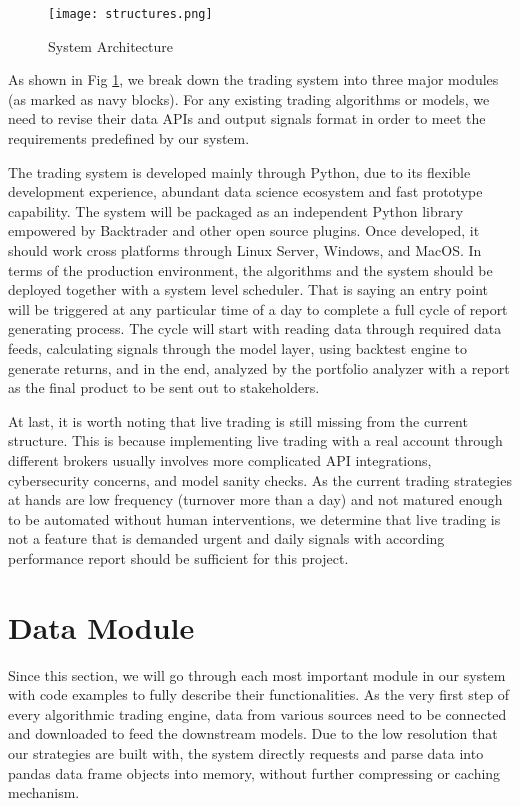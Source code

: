 \documentclass[12pt]{article}
\begin{document}
\begin{figure}[H]
    \centering
    \texttt{[image: structures.png]}
    \caption{System Architecture}
    \label{fig:system_architecture}
\end{figure}

As shown in Fig \ref{fig:system_architecture}, we break down the trading system into three major modules (as marked as navy blocks). For any existing trading algorithms or models, we need to revise their data APIs and output signals format in order to meet the requirements predefined by our system.

The trading system is developed mainly through Python, due to its flexible development experience, abundant data science ecosystem and fast prototype capability. The system will be packaged as an independent Python library empowered by Backtrader and other open source plugins. Once developed, it should work cross platforms through Linux Server, Windows, and MacOS. In terms of the production environment, the algorithms and the system should be deployed together with a system level scheduler. That is saying an entry point will be triggered at any particular time of a day to complete a full cycle of report generating process. The cycle will start with reading data through required data feeds, calculating signals through the model layer, using backtest engine to generate returns, and in the end, analyzed by the portfolio analyzer with a report as the final product to be sent out to stakeholders. 

At last, it is worth noting that live trading is still missing from the current structure. This is because implementing live trading with a real account through different brokers usually involves more complicated API integrations, cybersecurity concerns, and model sanity checks. As the current trading strategies at hands are low frequency (turnover more than a day) and not matured enough to be automated without human interventions, we determine that live trading is not a feature that is demanded urgent and daily signals with according performance report should be sufficient for this project.

\section{Data Module}

Since this section, we will go through each most important module in our system with code examples to fully describe their functionalities. As the very first step of every algorithmic trading engine, data from various sources need to be connected and downloaded to feed the downstream models. Due to the low resolution that our strategies are built with, the system directly requests and parse data into pandas data frame objects into memory, without further compressing or caching mechanism.
\end{document}

